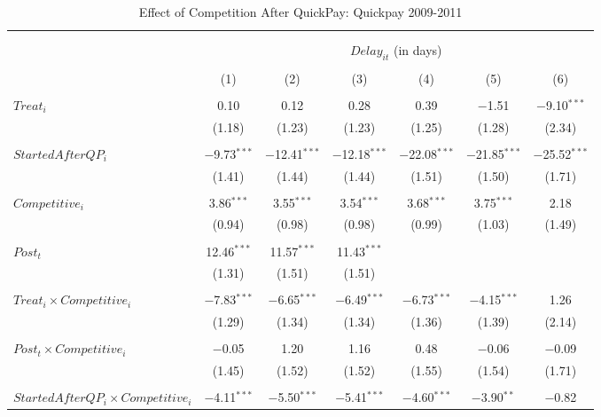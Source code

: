 \documentclass[
]{article}
\begin{document}
\begin{table}[H] \centering 
  \caption{Effect of Competition After QuickPay: Quickpay 2009-2011} 
  \label{} 
\small 
\begin{tabular}{@{\extracolsep{-3pt}}lcccccc} 
\\[-1.8ex]\hline 
\hline \\[-1.8ex] 
\\[-1.8ex] & \multicolumn{6}{c}{$Delay_{it}$ (in days)} \\ 
\\[-1.8ex] & (1) & (2) & (3) & (4) & (5) & (6)\\ 
\hline \\[-1.8ex] 
 $Treat_i$ & 0.10 & 0.12 & 0.28 & 0.39 & $-$1.51 & $-$9.10$^{***}$ \\ 
  & (1.18) & (1.23) & (1.23) & (1.25) & (1.28) & (2.34) \\ 
  & & & & & & \\ 
 $StartedAfterQP_i$ & $-$9.73$^{***}$ & $-$12.41$^{***}$ & $-$12.18$^{***}$ & $-$22.08$^{***}$ & $-$21.85$^{***}$ & $-$25.52$^{***}$ \\ 
  & (1.41) & (1.44) & (1.44) & (1.51) & (1.50) & (1.71) \\ 
  & & & & & & \\ 
 $Competitive_i$ & 3.86$^{***}$ & 3.55$^{***}$ & 3.54$^{***}$ & 3.68$^{***}$ & 3.75$^{***}$ & 2.18 \\ 
  & (0.94) & (0.98) & (0.98) & (0.99) & (1.03) & (1.49) \\ 
  & & & & & & \\ 
 $Post_t$ & 12.46$^{***}$ & 11.57$^{***}$ & 11.43$^{***}$ &  &  &  \\ 
  & (1.31) & (1.51) & (1.51) &  &  &  \\ 
  & & & & & & \\ 
 $Treat_i \times Competitive_i$ & $-$7.83$^{***}$ & $-$6.65$^{***}$ & $-$6.49$^{***}$ & $-$6.73$^{***}$ & $-$4.15$^{***}$ & 1.26 \\ 
  & (1.29) & (1.34) & (1.34) & (1.36) & (1.39) & (2.14) \\ 
  & & & & & & \\ 
 $Post_t \times Competitive_i$ & $-$0.05 & 1.20 & 1.16 & 0.48 & $-$0.06 & $-$0.09 \\ 
  & (1.45) & (1.52) & (1.52) & (1.55) & (1.54) & (1.71) \\ 
  & & & & & & \\ 
 $StartedAfterQP_i \times Competitive_i$ & $-$4.11$^{***}$ & $-$5.50$^{***}$ & $-$5.41$^{***}$ & $-$4.60$^{***}$ & $-$3.90$^{**}$ & $-$0.82 \\ 

\end{tabular}
\end{table}
\end{document}

